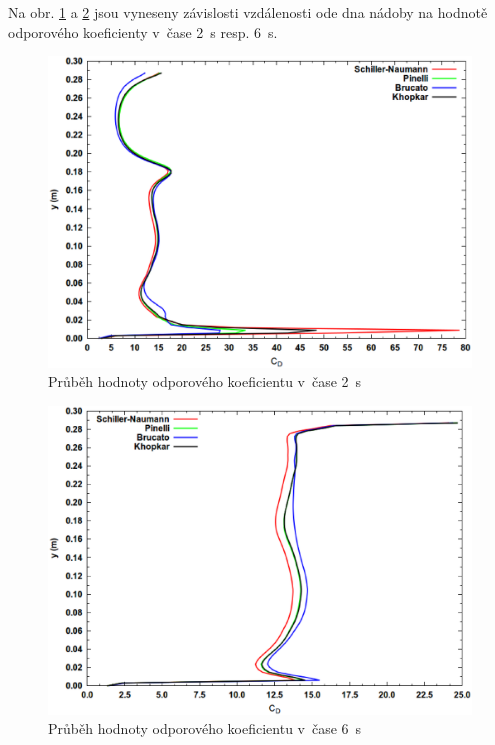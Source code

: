 
\newpage

Na obr. \ref{fig:cd2} a \ref{fig:cd6} jsou vyneseny závislosti vzdálenosti ode dna nádoby na hodnotě odporového koeficienty v~čase \SI{2}{\second} resp. \SI{6}{\second}.

\begin{figure}[h!]
\begin{center}
\includegraphics[scale=0.47]{images/CD-2.eps}
\caption{Průběh hodnoty odporového koeficientu v~čase \SI{2}{\second}}
\label{fig:cd2}
\end{center}
\end{figure} 

\vspace{-12mm}

\begin{figure}[h!]
\begin{center}
\includegraphics[scale=0.47]{images/CD-6.eps}
\caption{Průběh hodnoty odporového koeficientu v~čase \SI{6}{\second}}
\label{fig:cd6}
\end{center}
\end{figure} 

